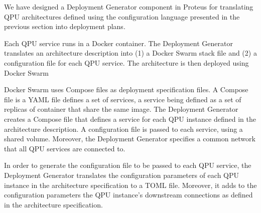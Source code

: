 We have designed a Deployment Generator component in Proteus for translating QPU architectures defined using the configuration
language presented in the previous section into deployment plans.

Each QPU service runs in a Docker \cite{docker} container.
The Deployment Generator translates an architecture description into (1) a Docker Swarm stack file
and (2) a configuration file for each QPU service.
The architecture is then deployed using Docker Swarm \cite{docker:swarm}

Docker Swarm uses Compose files \cite{docker:composefile} as deployment specification files.
A Compose file is a YAML \cite{yaml} file defines a set of services, a service being defined as a set of replicas of container that share the same image.
The Deployment Generator creates a Compose file that defines a service for each QPU instance defined in the architecture description.
A configuration file is passed to each service, using a shared volume.
Moreover, the Deployment Generator specifies a common network that all QPU services are connected to.

In order to generate the configuration file to be passed to each QPU service, the Deployment Generator translates the configuration parameters
of each QPU instance in the architecture specification to a TOML \cite{toml} file.
Moreover, it adds to the configuration parameters the QPU instance's downstream connections as defined in the architecture specification.



